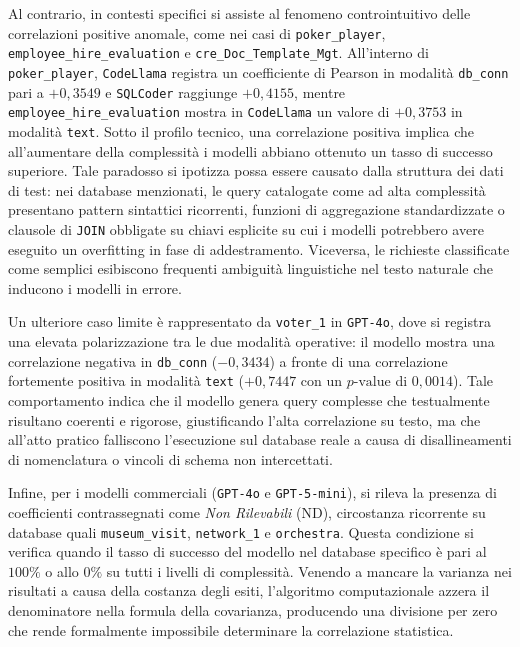 Al contrario, in contesti specifici si assiste al fenomeno
controintuitivo delle correlazioni positive anomale, come nei
casi di \texttt{poker\_player}, \texttt{employee\_hire\_evaluation} e
\texttt{cre\_Doc\_Template\_Mgt}. All'interno di \texttt{poker\_player},
\texttt{CodeLlama} registra un coefficiente di Pearson in modalità
\texttt{db\_conn} pari a \(+0,3549\) e \texttt{SQLCoder} raggiunge
\(+0,4155\), mentre \texttt{employee\_hire\_evaluation} mostra in
\texttt{CodeLlama} un valore di \(+0,3753\) in modalità \texttt{text}.
Sotto il profilo tecnico, una correlazione positiva implica che
all'aumentare della complessità i modelli abbiano ottenuto un tasso di
successo superiore. Tale paradosso si ipotizza possa essere causato dalla struttura dei
dati di test: nei database menzionati, le query catalogate come ad alta
complessità presentano pattern sintattici ricorrenti, funzioni di
aggregazione standardizzate o clausole di \texttt{JOIN} obbligate su
chiavi esplicite su cui i modelli potrebbero avere eseguito un overfitting
in fase di addestramento. Viceversa, le richieste classificate come
semplici esibiscono frequenti ambiguità linguistiche nel testo naturale
che inducono i modelli in errore.

Un ulteriore caso limite è rappresentato da \texttt{voter\_1} in
\texttt{GPT-4o}, dove si registra una elevata polarizzazione tra le due
modalità operative: il modello mostra una correlazione negativa in
\texttt{db\_conn} (\(-0,3434\)) a fronte di una correlazione fortemente
positiva in modalità \texttt{text} (\(+0,7447\) con un
\(p\text{-value}\) di \(0,0014\)). Tale comportamento indica che il
modello genera query complesse che testualmente risultano coerenti e
rigorose, giustificando l'alta correlazione su testo, ma che
all'atto pratico falliscono l'esecuzione sul database reale a causa di
disallineamenti di nomenclatura o vincoli di schema non intercettati.

Infine, per i modelli commerciali (\texttt{GPT-4o} e \texttt{GPT-5-mini}), 
si rileva la presenza di coefficienti contrassegnati come
\emph{Non Rilevabili} (ND), circostanza ricorrente su database quali
\texttt{museum\_visit}, \texttt{network\_1} e \texttt{orchestra}. Questa
condizione si verifica quando il tasso di successo del modello nel
database specifico è pari al \(100\%\) o allo \(0\%\) su tutti i livelli
di complessità. Venendo a mancare la varianza nei risultati a causa
della costanza degli esiti, l'algoritmo computazionale azzera il
denominatore nella formula della covarianza, producendo una divisione
per zero che rende formalmente impossibile determinare la correlazione
statistica.

